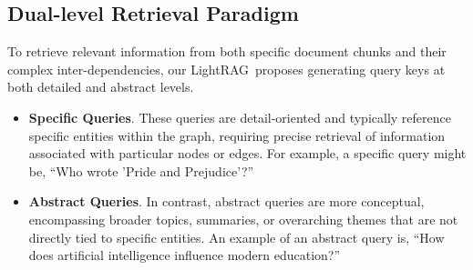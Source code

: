 \documentclass{article} %
\def\model{LightRAG}
\begin{document}

\subsection{Dual-level Retrieval Paradigm}
To retrieve relevant information from both specific document chunks and their complex inter-dependencies, our \model\ proposes generating query keys at both detailed and abstract levels.\vspace{-0.05in}
\begin{itemize}[leftmargin=*]

\item \textbf{Specific Queries}. These queries are detail-oriented and typically reference specific entities within the graph, requiring precise retrieval of information associated with particular nodes or edges. For example, a specific query might be, ``Who wrote 'Pride and Prejudice'?''

\item \textbf{Abstract Queries}. In contrast, abstract queries are more conceptual, encompassing broader topics, summaries, or overarching themes that are not directly tied to specific entities. An example of an abstract query is, ``How does artificial intelligence influence modern education?''

\end{itemize}

\end{document}
